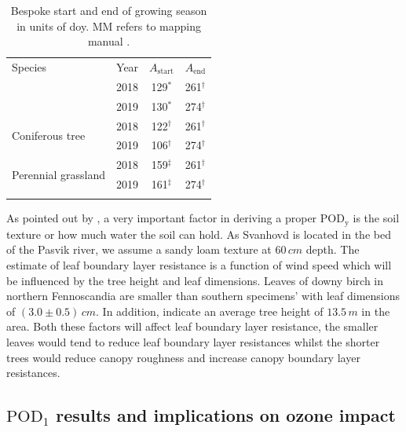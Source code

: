 \documentclass[bg, manuscript]{copernicus}
\begin{document}
\begin{table}[t]
  \caption{Bespoke start and end of growing season in units of \unit{doy}. MM refers to mapping manual \citep{GCB:Mills2011,ICP:MappingManual2017}.}
  \label{tab:sensitivity_tests_gs}
  \begin{tabular}{llcc}
    \tophline
    Species & Year & $A_\mathrm{start}$ & $A_\mathrm{end}$\\
    \middlehline
    \multirow{2}{*}{Deciduous tree} & 2018 & 129$^*$ & 261$^\dagger$ \\
    & 2019 & 130$^*$ & 274$^\dagger$ \\
    \multirow{2}{*}{Coniferous tree} & 2018 & 122$^\dagger$ & 261$^\dagger$ \\
    & 2019 & 106$^\dagger$ & 274$^\dagger$ \\
    \multirow{2}{*}{Perennial grassland} & 2018 & 159$^\ddagger$ & 261$^\dagger$\\
    & 2019 & 161$^\ddagger$ & 274$^\dagger$ \\
    \bottomhline
  \end{tabular}
\end{table}


As pointed out by \citet{ACP:Bueker2012}, a very important factor in deriving a proper $\mathrm{POD_y}$ is the soil texture or how much water the soil can hold. As Svanhovd is located in the bed of the Pasvik river, we assume a sandy loam texture at $60\,\unit{cm}$ depth. The estimate of leaf boundary layer resistance is a function of wind speed which will be influenced by the tree height and leaf dimensions. Leaves of downy birch in northern Fennoscandia are smaller than southern specimens' with leaf dimensions of $(3.0\pm 0.5)\,\unit{cm}$. In addition, \citet[][p.~52]{NINA2004} indicate an average tree height of $13.5\,\unit{m}$ in the area. Both these factors will affect leaf boundary layer resistance, the smaller leaves would tend to reduce leaf boundary layer resistances whilst the shorter trees would reduce canopy roughness and increase canopy boundary layer resistances.

\subsection{$\mathrm{POD_1}$ results and implications on ozone impact}
\label{subsec:do3se_results}
\end{document}
